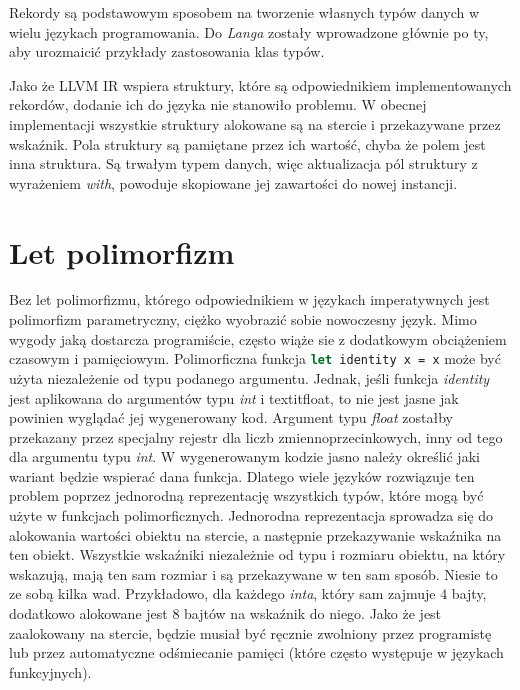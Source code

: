 \documentclass[declaration,shortabstract]{iithesis}
\begin{document}
Rekordy są podstawowym sposobem na tworzenie własnych typów danych w wielu 
językach programowania. Do \textit{Langa} zostały wprowadzone głównie po ty, 
aby urozmaicić przykłady zastosowania klas typów. 

Jako że LLVM IR wspiera struktury, które są odpowiednikiem implementowanych 
rekordów, dodanie ich do języka nie stanowiło problemu. W obecnej 
implementacji 
wszystkie struktury alokowane są na stercie i przekazywane przez wskaźnik.
Pola struktury są pamiętane przez ich wartość, chyba że polem jest inna 
struktura. Są trwałym typem danych, więc aktualizacja pól struktury 
z wyrażeniem \textit{with}, powoduje skopiowane jej zawartości do nowej 
instancji.

\section{Let polimorfizm}


Bez let polimorfizmu, którego odpowiednikiem w językach imperatywnych jest 
polimorfizm parametryczny, ciężko wyobrazić sobie nowoczesny język. 
Mimo wygody jaką dostarcza programiście, często wiąże sie z dodatkowym
obciążeniem czasowym i pamięciowym. Polimorficzna funkcja 
\lstinline[language=Caml]!let identity x = x! może być użyta niezależenie
od typu podanego argumentu. Jednak, jeśli funkcja \textit{identity} 
jest aplikowana do argumentów typu \textit{int} i textit{float}, to nie jest 
jasne jak powinien wyglądać jej wygenerowany kod. Argument typu \textit{float}
zostałby przekazany przez specjalny rejestr dla liczb zmiennoprzecinkowych, 
inny od tego dla argumentu typu \textit{int}. W wygenerowanym kodzie jasno
należy określić jaki wariant będzie wspierać dana funkcja. Dlatego wiele 
języków rozwiązuje ten problem poprzez jednorodną reprezentację wszystkich 
typów, które mogą być użyte w funkcjach polimorficznych. Jednorodna 
reprezentacja sprowadza się do alokowania wartości obiektu na stercie, a 
następnie przekazywanie wskaźnika na ten obiekt. Wszystkie wskaźniki 
niezależnie od typu i rozmiaru obiektu, na który wskazują, mają ten sam 
rozmiar i są przekazywane w ten sam sposób. Niesie to ze sobą kilka wad.
Przykładowo, dla każdego \textit{inta}, który sam zajmuje $4$ bajty,
dodatkowo alokowane jest $8$ bajtów na wskaźnik do niego. Jako że jest 
zaalokowany na stercie, będzie musiał być ręcznie zwolniony przez programistę 
lub przez automatyczne odśmiecanie pamięci (które często występuje w językach 
funkcyjnych).
\end{document}
